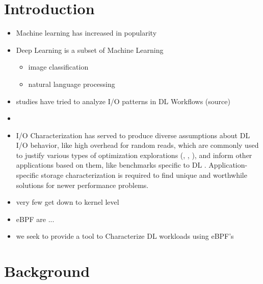 \documentclass[conference]{IEEEtran}
\begin{document}
\section{Introduction}
\begin{itemize}
	\item Machine learning has increased in popularity
	\item Deep Learning is a subset of Machine Learning
	      \begin{itemize}
		      \item image classification
		      \item natural language processing
	      \end{itemize}
	\item studies have tried to analyze I/O patterns in DL Workflows (source)
	\item \item I/O Characterization has served to produce diverse assumptions about DL I/O behavior, like high overhead for random reads, which are commonly used to justify various types of optimization explorations (\cite{LMDB}, \cite{nvme}, \cite{beegfs}), and inform other applications based on them, like benchmarks specific to DL \cite{TFbenchmark}. Application-specific storage characterization is required to find unique and worthwhile solutions for newer performance problems.
	\item very few get down to kernel level
	\item eBPF are ...
	\item we seek to provide a tool to Characterize DL workloads using eBPF's
\end{itemize}

\section{Background}

\end{document}
